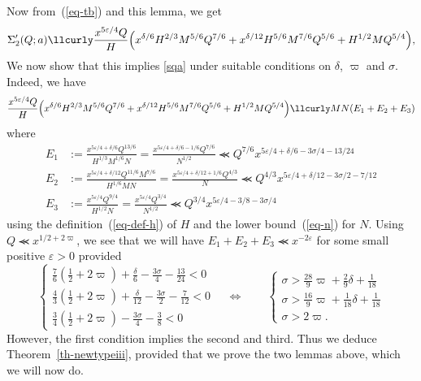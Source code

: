 \documentclass[12pt,a4paper,reqno]{amsart}
\numberwithin{equation}{section}
\theoremstyle{plain}
\theoremstyle{definition}
\newcommand\eps{\varepsilon}
\renewcommand{\lessapprox}{\llcurly}
\begin{document}
Now from~(\ref{eq-tb}) and this lemma, we get
$$
\Sigma'_2(Q;a)\lessapprox \frac{x^{5\eps/4}Q}{H} \Bigl(
x^{\delta/6}H^{2/3}M^{5/6}Q^{7/6}+ x^{\delta/12}H^{5/6}M^{7/6}Q^{5/6}+
H^{1/2}MQ^{5/4} \Bigr),
$$
We now show that this implies \eqref{sqa} under suitable conditions on
$\delta$, $\varpi$ and $\sigma$. Indeed, we have
$$
\frac{x^{5\eps/4}Q}{H} \Bigl( x^{\delta/6}H^{2/3}M^{5/6}Q^{7/6}+
x^{\delta/12}H^{5/6}M^{7/6}Q^{5/6}+ H^{1/2}MQ^{5/4} \Bigr) \lessapprox
MN( E_1+E_2+E_3)
$$
where
\begin{align*}
  E_1&:=\frac{x^{5\eps/4+\delta/6}Q^{13/6}}{H^{1/3}M^{1/6}N}
  =\frac{x^{5\eps/4+\delta/6-1/6}Q^{7/6}}{N^{1/2}} \lessapprox
  Q^{7/6}x^{5\eps/4+\delta/6-3\sigma/4-13/24}
  \\
  E_2&:=\frac{x^{5\eps/4+\delta/12}Q^{11/6}M^{7/6}}{H^{1/6} MN}
  =\frac{x^{5\eps/4+\delta/12+1/6}Q^{4/3}}{N} \lessapprox
  Q^{4/3}x^{5\eps/4+\delta/12-3\sigma/2-7/12}
  \\
  E_3&:=\frac{x^{5\eps/4}Q^{9/4}}{H^{1/2}N}
  =\frac{x^{5\eps/4}Q^{3/4}}{N^{1/2}}\lessapprox
  Q^{3/4}x^{5\eps/4-3/8-3\sigma/4}
\end{align*}
using the definition~(\ref{eq-def-h}) of $H$ and the lower
bound~(\ref{eq-n}) for $N$. Using $Q \lessapprox x^{1/2+2\varpi}$, we see that we will
have $E_1+E_2+E_3\lessapprox x^{-2\eps}$ for some small positive
$\eps>0$ provided
$$
\begin{cases}
  \tfrac{7}{6}(\tfrac{1}{2}+2\varpi)+\tfrac{\delta}{6}-\tfrac{3\sigma}{4}
  - \tfrac{13}{24}<0\\
  \tfrac{4}{3}(\tfrac{1}{2}+2\varpi)+\tfrac{\delta}{12}-\tfrac{3\sigma}{2}
  - \tfrac{7}{12}<0\\
  \tfrac{3}{4}(\tfrac{1}{2}+2\varpi)-\tfrac{3\sigma}{4}
  -\tfrac{3}{8}<0
\end{cases}\quad
\Leftrightarrow \quad\quad
\begin{cases}
\sigma>\tfrac{28}{9}\varpi+\tfrac{2}{9}\delta+\tfrac{1}{18}\\
\sigma>\tfrac{16}{9}\varpi+\tfrac{1}{18}\delta+\tfrac{1}{18}\\
\sigma>2\varpi.
\end{cases}
$$
However, the first condition implies the second and third. Thus we
deduce Theorem~\ref{th-newtypeiii}, provided that we prove the two lemmas
above, which we will now do.
\end{document}
